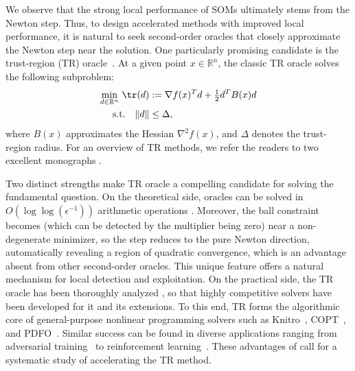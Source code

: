 We observe that the strong local performance of SOMs ultimately stems from the Newton step. Thus, to design accelerated methods with improved local performance, it is natural to seek second-order oracles that closely approximate the Newton step near the solution. One particularly promising candidate is the trust-region (TR) oracle~\cite{More1983,conn2000trust,yuan2015recent}. At a given point \( x \in \mathbb{R}^n \), the classic TR oracle solves the following subproblem:
\begin{equation}
    \label{eq.classic tr subproblem}
    \begin{aligned}
        \underset{d \in \mathbb{R}^n}{\min}~\tr(d) & :=     \nabla f(x)^T d + \tfrac{1}{2} d^T B(x) d \\
        \text{s.t.} \quad  \|d\|                   & \le \Delta,
    \end{aligned}
\end{equation}
where \( B(x) \) approximates the Hessian \( \nabla^2 f(x) \), and \( \Delta \) denotes the trust-region radius. For an overview of TR methods, we refer the readers to two excellent monographs \cite{yuan2000review,yuan2015recent}.

Two distinct strengths make TR oracle a compelling candidate for solving the fundamental question. On the theoretical side, \tr{} oracles can be solved in $O(\log\log(\epsilon^{-1}))$ arithmetic operations \cite{vavasisProvingPolynomialtimeSphereconstrained1990,yenewcomplexityresult1991}.
Moreover, the ball constraint becomes (which can be detected by the multiplier being zero) near a non-degenerate minimizer, so the step reduces to the pure Newton direction, automatically revealing a region of quadratic convergence, which is an advantage absent from other second-order oracles. This unique feature offers a natural mechanism for local detection and exploitation.
On the practical side, the TR oracle has been thoroughly analyzed \cite{jiangHolderianErrorBounds2022,rojasNewMatrixfreeAlgorithm2001}, so that highly competitive solvers have been developed \cite{rojasNewMatrixfreeAlgorithm2001, adachiSolvingTrustregionSubproblem2017, adachiEigenvaluebasedAlgorithmAnalysis2019} for it and its extensions.
To this end, TR forms the algorithmic core of general-purpose nonlinear programming solvers such as Knitro~\cite{byrd2006k}, COPT~\cite{geCardinalOptimizerCOPT2022}, and PDFO~\cite{ragonneau2024pdfo}. Similar success can be found in diverse applications ranging from adversarial training~\cite{yao2019trust} to reinforcement learning~\cite{schulman2015trust}. These advantages of \tr{} call for a systematic study of accelerating the TR method.

